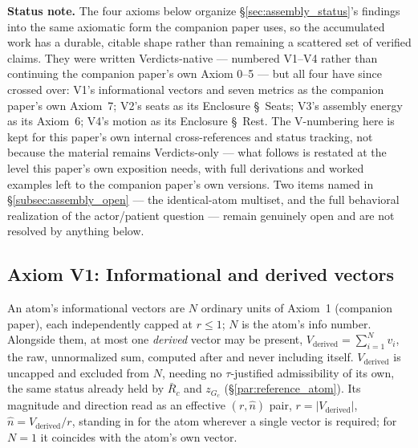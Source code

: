 \documentclass[12pt, a4paper]{article}
\begin{document}
\textbf{Status note.} The four axioms below organize
\S\ref{sec:assembly_status}'s findings into the same axiomatic form
the companion paper uses, so the accumulated work has a durable,
citable shape rather than remaining a scattered set of verified
claims. They were written Verdicts-native --- numbered V1--V4 rather
than continuing the companion paper's own Axiom 0--5 --- but all
four have since crossed over: V1's informational vectors and seven
metrics as the companion paper's own Axiom~7; V2's seats as its
Enclosure \S~Seats; V3's assembly energy as its Axiom~6; V4's motion
as its Enclosure \S~Rest. The V-numbering here is kept for this
paper's own internal cross-references and status tracking, not
because the material remains Verdicts-only --- what follows is
restated at the level this paper's own exposition needs, with full
derivations and worked examples left to the companion paper's own
versions. Two items named in \S\ref{subsec:assembly_open} --- the
identical-atom multiset, and the full behavioral realization of the
actor/patient question --- remain genuinely open and are not
resolved by anything below.

\subsection{Axiom V1: Informational and derived vectors}
\label{axiom:v1}
An atom's informational vectors are $N$ ordinary units of Axiom~1
(companion paper), each independently capped at $r\le 1$; $N$ is the
atom's info number. Alongside them, at most one \emph{derived}
vector may be present, $V_{\text{derived}}=\sum_{i=1}^N v_i$, the
raw, unnormalized sum, computed after and never including itself.
$V_{\text{derived}}$ is uncapped and excluded from $N$, needing no
$\tau$-justified admissibility of its own, the same status already
held by $\bar R_c$ and $z_{G_c}$ (\S\ref{par:reference_atom}). Its
magnitude and direction read as an effective $(r,\hat n)$ pair, $r =
\lvert V_{\text{derived}}\rvert$, $\hat n=V_{\text{derived}}/r$,
standing in for the atom wherever a single vector is required; for
$N=1$ it coincides with the atom's own vector.
\end{document}
